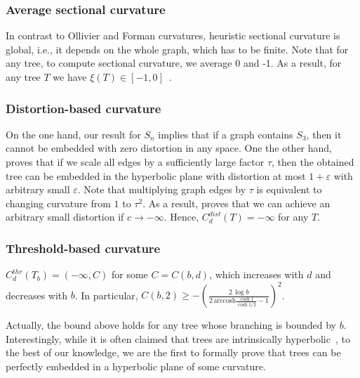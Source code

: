 \documentclass[runningheads]{llncs}
\begin{document}
\subsubsection{Average sectional curvature} In contrast to Ollivier and Forman curvatures, heuristic sectional curvature is global, i.e., it depends on the whole graph, which has to be finite. Note that for any tree, to compute sectional curvature, we average 0 and -1. As a result, for any tree $T$ we have $\xi(T) \in [-1,0]$~\cite{gu2019learning}.

\subsubsection{Distortion-based curvature} 

On the one hand, our result for $S_n$ implies that if a graph contains $S_3$, then it cannot be embedded with zero distortion in any space. One the other hand, \cite{sarkar2011low} proves that if we scale all edges by a sufficiently large factor $\tau$, then the obtained tree can be embedded in the hyperbolic plane with distortion at most $1 + \varepsilon$ with arbitrary small $\varepsilon$. Note that multiplying graph edges by $\tau$ is equivalent to changing curvature from $1$ to $\tau^2$. As a result, \cite{sarkar2011low} proves that we can achieve an arbitrary small distortion if $c \to -\infty$.
Hence, $C_d^{dist}(T) = -\infty$ for any $T$.

\subsubsection{Threshold-based curvature} 


\begin{theorem}\label{thm:tree_threshold}
$C_d^{thr}(T_b) = (-\infty, C)$ for some $C = C(b,d)$, which increases with $d$ and decreases with $b$. 
In particular, $C(b,2) \ge - \left( \frac{2\,\log b}{2 \, \mathrm{arccosh} \frac{\cosh 1}{\cosh 1/2} - 1} \right)^2$.
\end{theorem}

Actually, the bound above holds for any tree whose branching is bounded by $b$.
Interestingly, while it is often claimed that trees are intrinsically hyperbolic~\cite{krioukov2010hyperbolic,nickel2017poincare}, to the best of our knowledge, we are the first to formally prove that trees can be perfectly embedded in a hyperbolic plane of some curvature.  
\end{document}
